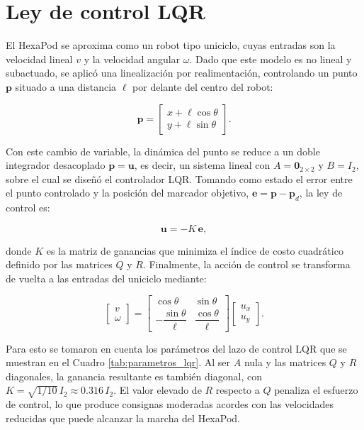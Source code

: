 \section{Ley de control LQR}

El HexaPod se aproxima como un robot tipo uniciclo, cuyas entradas son la velocidad lineal $v$ y la velocidad angular $\omega$. Dado que este modelo es no lineal y subactuado, se aplicó una linealización por realimentación, controlando un punto $\mathbf{p}$ situado a una distancia $\ell$ por delante del centro del robot:

\begin{equation}
\mathbf{p} =
\begin{bmatrix} x + \ell\cos\theta \\ y + \ell\sin\theta \end{bmatrix}.
\end{equation}

Con este cambio de variable, la dinámica del punto se reduce a un doble integrador desacoplado $\dot{\mathbf{p}} = \mathbf{u}$, es decir, un sistema lineal con $A = \mathbf{0}_{2\times2}$ y $B = I_2$, sobre el cual se diseñó el controlador LQR. Tomando como estado el error entre el punto controlado y la posición del marcador objetivo, $\mathbf{e} = \mathbf{p} - \mathbf{p}_d$, la ley de control es:

\begin{equation}
\mathbf{u} = -K\,\mathbf{e},
\end{equation}

donde $K$ es la matriz de ganancias que minimiza el índice de costo cuadrático definido por las matrices $Q$ y $R$. Finalmente, la acción de control se transforma de vuelta a las entradas del uniciclo mediante:

\begin{equation}
\begin{bmatrix} v \\ \omega \end{bmatrix} =
\begin{bmatrix} \cos\theta & \sin\theta \\ -\dfrac{\sin\theta}{\ell} & \dfrac{\cos\theta}{\ell} \end{bmatrix}
\begin{bmatrix} u_x \\ u_y \end{bmatrix}.
\end{equation}

Para esto se tomaron en cuenta los parámetros del lazo de control LQR que se muestran en el Cuadro \ref{tab:parametros_lqr}. Al ser $A$ nula y las matrices $Q$ y $R$ diagonales, la ganancia resultante es también diagonal, con $K = \sqrt{1/10}\,I_2 \approx 0.316\,I_2$. El valor elevado de $R$ respecto a $Q$ penaliza el esfuerzo de control, lo que produce consignas moderadas acordes con las velocidades reducidas que puede alcanzar la marcha del HexaPod.

